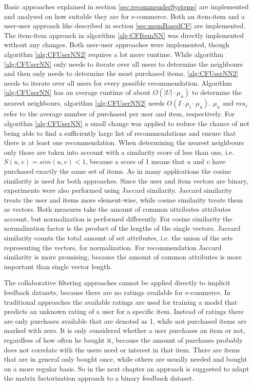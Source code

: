 \documentclass[10pt]{reportMaster}
\begin{document}
Basic approaches explained in section \ref{sec:recommenderSystems} are implemented and analysed on how suitable they are for e-commerce.
Both an item-item and a user-user approach like described in section \ref{sec:memBasedCF} are implemented.
The item-item approach in algorithm \ref{alg:CFItemNN} was directly implemented without any changes.
Both user-user approaches were implemented, though algorithm \ref{alg:CFUserNN2} requires a lot more runtime.
While algorithm \ref{alg:CFUserNN} only needs to iterate over all users to determine the neighbours and then only needs to determine the most purchased items, \ref{alg:CFUserNN2} needs to iterate over all users for every possible recommendation.
Algorithm \ref{alg:CFUserNN} has an average runtime of about $O(|U| \cdot \mu_u)$ to determine the nearest neighbours, algorithm \ref{alg:CFUserNN2} needs $O(I \cdot \mu_i \cdot \mu_u)$.
$\mu_u$ and $mu_i$ refer to the average number of purchased per user and item, respectively.
For algorithm \ref{alg:CFUserNN} a small change was applied to reduce the chance of not being able to find a sufficiently large list of recommendations and ensure that there is at least one recommendation.
When determining the nearest neighbours only those are taken into account with a similarity score of less than one, i.e. $S(u,v) = sim(u, v) < 1$, because a score of 1 means that $u$ and $v$ have purchased exactly the same set of items.
As in many applications the cosine similarity is used for both approaches.
Since the user and item vectors are binary, experiments were also performed using Jaccard similarity.
Jaccard similarity treats the user and items more element-wise, while cosine similarity treats them as vectors.
Both measures take the amount of common attributes attributes account, but normalization is performed differently.
For cosine similarity the normalization factor is the product of the lengths of the single vectors.
Jaccard similarity counts the total amount of set attributes, i.e. the union of the sets representing the vectors, for normalization.
For recommendation Jaccard similarity is more promising, because the amount of common attributes is more important than single vector length.

The collaborative filtering approaches cannot be applied directly to implicit feedback datasets, because there are no ratings available for e-commerce.
In traditional approaches the available ratings are used for training a model that predicts an unknown rating of a user for a specific item.
Instead of ratings there are only purchases available that are denoted as 1, while not purchased items are marked with zero.
It is only considered whether a user purchases an item or not, regardless of how often he bought it, because the amount of purchases probably does not correlate with the users need or interest in that item.
There are items that are in general only bought once, while others are usually needed and bought on a more regular basis. 
So in the next chapter an approach is suggested to adapt the matrix factorization approach to a binary feedback dataset.
\end{document}
